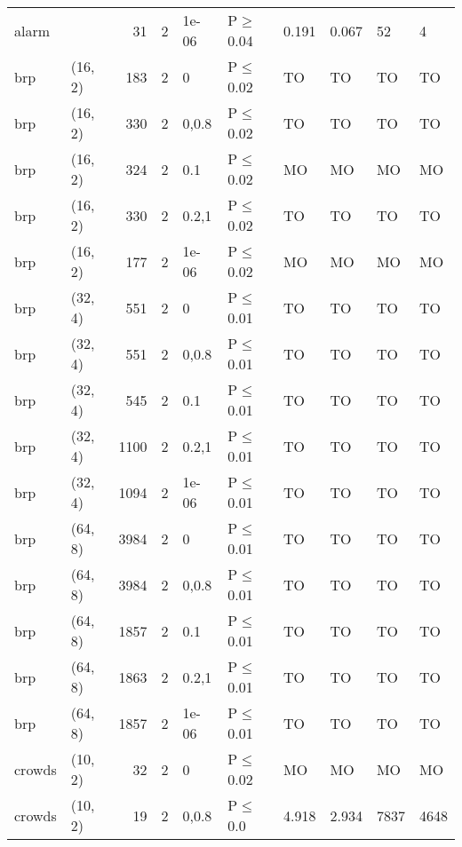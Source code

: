 \begin{longtable}{llrrllllll}
 alarm         &           &     	31 &   2 & 1e-06 & P$\geq$0.04  & 0.191    & 0.067    & 52      & 4      \\
 brp           & (16, 2)   &    	183 &   2 & 0     & P$\leq$0.02  & TO       & TO       & TO      & TO     \\
 brp           & (16, 2)   &    	330 &   2 & 0,0.8 & P$\leq$0.02  & TO       & TO       & TO      & TO     \\
 brp           & (16, 2)   &    	324 &   2 & 0.1   & P$\leq$0.02  & MO       & MO       & MO      & MO     \\
 brp           & (16, 2)   &    	330 &   2 & 0.2,1 & P$\leq$0.02  & TO       & TO       & TO      & TO     \\
 brp           & (16, 2)   &    	177 &   2 & 1e-06 & P$\leq$0.02  & MO       & MO       & MO      & MO     \\
 brp           & (32, 4)   &    	551 &   2 & 0     & P$\leq$0.01  & TO       & TO       & TO      & TO     \\
 brp           & (32, 4)   &    	551 &   2 & 0,0.8 & P$\leq$0.01  & TO       & TO       & TO      & TO     \\
 brp           & (32, 4)   &    	545 &   2 & 0.1   & P$\leq$0.01  & TO       & TO       & TO      & TO     \\
 brp           & (32, 4)   &   	1100 &   2 & 0.2,1 & P$\leq$0.01  & TO       & TO       & TO      & TO     \\
 brp           & (32, 4)   &   	1094 &   2 & 1e-06 & P$\leq$0.01  & TO       & TO       & TO      & TO     \\
 brp           & (64, 8)   &   	3984 &   2 & 0     & P$\leq$0.01  & TO       & TO       & TO      & TO     \\
 brp           & (64, 8)   &   	3984 &   2 & 0,0.8 & P$\leq$0.01  & TO       & TO       & TO      & TO     \\
 brp           & (64, 8)   &   	1857 &   2 & 0.1   & P$\leq$0.01  & TO       & TO       & TO      & TO     \\
 brp           & (64, 8)   &   	1863 &   2 & 0.2,1 & P$\leq$0.01  & TO       & TO       & TO      & TO     \\
 brp           & (64, 8)   &   	1857 &   2 & 1e-06 & P$\leq$0.01  & TO       & TO       & TO      & TO     \\
 crowds        & (10, 2)   &     	32 &   2 & 0     & P$\leq$0.02  & MO       & MO       & MO      & MO     \\
 crowds        & (10, 2)   &     	19 &   2 & 0,0.8 & P$\leq$0.0   & 4.918    & 2.934    & 7837    & 4648   \\

\end{longtable}
